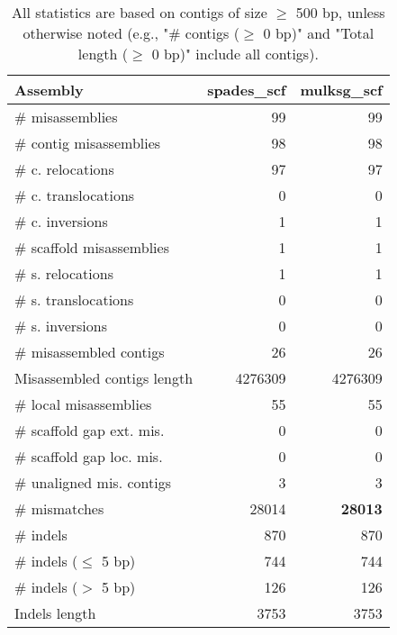 \documentclass[12pt,a4paper]{article}
\begin{document}
\begin{table}[ht]
\begin{center}
\caption{All statistics are based on contigs of size $\geq$ 500 bp, unless otherwise noted (e.g., "\# contigs ($\geq$ 0 bp)" and "Total length ($\geq$ 0 bp)" include all contigs).}
\begin{tabular}{|l*{2}{|r}|}
\hline
Assembly & spades\_scf & mulksg\_scf \\ \hline
\# misassemblies & 99 & 99 \\ \hline
\hspace{2mm}\# contig misassemblies & 98 & 98 \\ \hline
\hspace{5mm}\# c. relocations & 97 & 97 \\ \hline
\hspace{5mm}\# c. translocations & 0 & 0 \\ \hline
\hspace{5mm}\# c. inversions & 1 & 1 \\ \hline
\hspace{2mm}\# scaffold misassemblies & 1 & 1 \\ \hline
\hspace{5mm}\# s. relocations & 1 & 1 \\ \hline
\hspace{5mm}\# s. translocations & 0 & 0 \\ \hline
\hspace{5mm}\# s. inversions & 0 & 0 \\ \hline
\# misassembled contigs & 26 & 26 \\ \hline
Misassembled contigs length & 4276309 & 4276309 \\ \hline
\# local misassemblies & 55 & 55 \\ \hline
\# scaffold gap ext. mis. & 0 & 0 \\ \hline
\# scaffold gap loc. mis. & 0 & 0 \\ \hline
\# unaligned mis. contigs & 3 & 3 \\ \hline
\# mismatches & 28014 & {\bf 28013} \\ \hline
\# indels & 870 & 870 \\ \hline
\hspace{5mm}\# indels ($\leq$ 5 bp) & 744 & 744 \\ \hline
\hspace{5mm}\# indels ($>$ 5 bp) & 126 & 126 \\ \hline
Indels length & 3753 & 3753 \\ \hline
\end{tabular}
\end{center}
\end{table}
\end{document}
